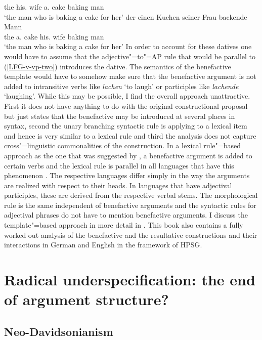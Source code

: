      the his.\dat{} wife a.\acc{} cake baking man\\
\glt `the man who is baking a cake for her'
\ex
\gll der einen Kuchen seiner Frau backende Mann\\
     the a.\acc{} cake  his.\dat{} wife baking man\\
\glt `the man who is baking a cake for her'
\zl
In order to account for these datives one would have to assume that the adjective"=to"=AP rule that
would be parallel to (\ref{LFG-v-vp-two}) introduces the dative. The semantics of the benefactive
template would have to somehow make sure that the benefactive argument is not added to intransitive
verbs like \emph{lachen} `to laugh' or participles like \emph{lachende} `laughing'. While this may
be possible, I find the overall approach unattractive. First it does not have anything to do with
the original constructional proposal but just states that the benefactive may be introduced at
several places in syntax, second the unary branching syntactic rule is applying to a lexical
item and hence is very similar to a lexical rule and third the analysis does not capture cross"=linguistic commonalities of the
construction. In a lexical rule"=based approach as the one that was suggested by
\citet[Section~5]{BC99a}, a benefactive argument is added to certain verbs
and the lexical rule is parallel in all languages that have this phenomenon \citep{MuellerLFGphrasal}. The respective
languages differ simply in the way the arguments are realized with respect to their heads. In languages
that have adjectival participles, these are derived from the respective verbal stems. The
morphological rule is the same independent of benefactive arguments and the syntactic rules for
adjectival phrases do not have to mention benefactive arguments. I discuss the template"=based
approach in more detail in \citet{MuellerLFGphrasal}. This book also contains a fully worked out
analysis of the benefactive and the resultative constructions and their interactions in German and English in the framework of HPSG\indexhpsg.



\section{Radical underspecification: the end of argument structure?}
\label{radical-sec}

\subsection{Neo-Davidsonianism}

